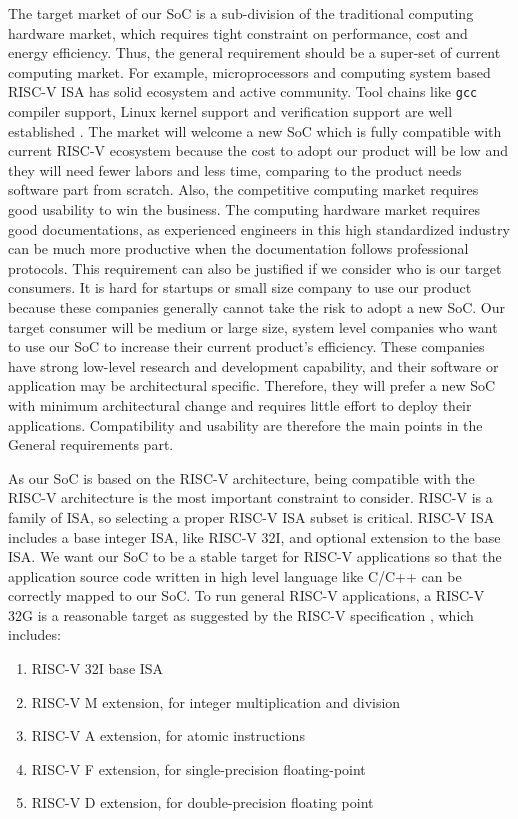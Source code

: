 The target market of our SoC is a sub-division of the traditional computing hardware market, which requires tight constraint on performance, cost and energy efficiency. Thus, the general requirement should be a super-set of current computing market. For example, microprocessors and computing system based RISC-V ISA has solid ecosystem and active community. Tool chains like \texttt{gcc} compiler support, Linux kernel support and verification support are well established \cite{rvsoftware}. The market will welcome a new SoC which is fully compatible with current RISC-V ecosystem because the cost to adopt our product will be low and they will need fewer labors and less time, comparing to the product needs software part from scratch. Also, the competitive computing market requires good usability to win the business. The computing hardware market requires good documentations, as experienced engineers in this high standardized industry can be much more productive when the documentation follows professional protocols. This requirement can also be justified if we consider who is our target consumers. It is hard for startups or small size company to use our product because these companies generally cannot take the risk to adopt a new SoC. Our target consumer will be medium or large size, system level companies who want to use our SoC to increase their current product's efficiency. These companies have strong low-level research and development capability, and their software or application may be architectural specific. Therefore, they will prefer a new SoC with minimum architectural change and requires little effort to deploy their applications. Compatibility and usability are therefore the main points in the General requirements part.

As our SoC is based on the RISC-V architecture, being compatible with the RISC-V architecture is the most important constraint to consider. RISC-V is a family of ISA, so selecting a proper RISC-V ISA subset is critical. RISC-V ISA includes a base integer ISA, like RISC-V 32I, and optional extension to the base ISA. We want our SoC to be a stable target for RISC-V applications so that the application source code written in high level language like C/C++ can be correctly mapped to our SoC. To run general RISC-V applications, a RISC-V 32G is a reasonable target as suggested by the RISC-V specification \cite{RISC-V_unprivileged_ISA}, which includes:
\begin{enumerate}
    \item RISC-V 32I base ISA
    \item RISC-V M extension, for integer multiplication and division
    \item RISC-V A extension, for atomic instructions
    \item RISC-V F extension, for single-precision floating-point
    \item RISC-V D extension, for double-precision floating point
\end{enumerate}

